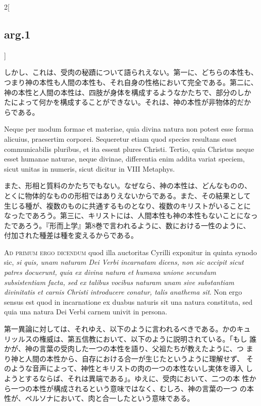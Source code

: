 \documentclass[paper=a4paper,fontsize=10pt,jafontsize=9pt,titlepage]{jlreq}
\begin{document}
\begin{paracol}{2}[\subsection{arg.1}]
\switchcolumn

しかし、これは、受肉の秘蹟について語られえない。第一に、どちらの本性も、
つまり神の本性も人間の本性も、それ自身の性格において完全である。第二に、
神の本性と人間の本性は、四肢が身体を構成するようなかたちで、部分のしか
たによって何かを構成することができない。それは、神の本性が非物体的だか
らである。

\switchcolumn*

Neque per modum formae et materiae, quia divina natura non potest esse
forma alicuius, praesertim corporei. Sequeretur etiam quod species
resultans esset communicabilis pluribus, et ita essent plures
Christi. Tertio, quia Christus neque esset humanae naturae, neque
divinae, differentia enim addita variat speciem, sicut unitas in
numeris, sicut dicitur in VIII Metaphys.

\switchcolumn

また、形相と質料のかたちでもない。なぜなら、神の本性は、どんなものの、
とくに物体的なものの形相ではありえないからである。また、その結果として
生じる種が、複数のものに共通するものとなり、複数のキリストがいることに
なったであろう。第三に、キリストには、人間本性も神の本性もないことになっ
たであろう。『形而上学』第8巻で言われるように、数における一性のように、
付加された種差は種を変えるからである。

\switchcolumn*[\subsection{ad.1}]

{\scshape Ad primum ergo dicendum} quod illa auctoritas Cyrilli
exponitur in quinta synodo sic, {\itshape si quis, unam naturam Dei
Verbi incarnatam dicens, non sic accipit sicut patres docuerunt, quia
ex divina natura et humana unione secundum subsistentiam facta, sed ex
talibus vocibus naturam unam sive substantiam divinitatis et carnis
Christi introducere conatur, talis anathema sit}. Non ergo sensus est
quod in incarnatione ex duabus naturis sit una natura constituta, sed
quia una natura Dei Verbi carnem univit in persona.

\switchcolumn

第一異論に対しては、それゆえ、以下のように言われるべきである。かのキュ
リッルスの権威は、第五信教において、以下のように説明されている。「もし
誰かが、神の言葉の受肉した一つの本性を語り、父祖たちが教えたように、つ
まり神と人間の本性から、自存における合一が生じたというように理解せず、
そのような音声によって、神性とキリストの肉の一つの本性ないし実体を導入
しようとするならば、それは異端である」。ゆえに、受肉において、二つの本
性から一つの本性が構成されるという意味ではなく、むしろ、神の言葉の一つ
の本性が、ペルソナにおいて、肉と合一したという意味である。


\end{paracol}
\end{document}
